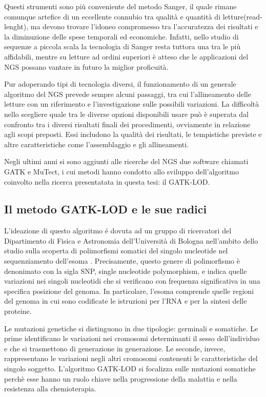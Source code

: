 Questi strumenti sono più conveniente del metodo Sanger, il quale rimane comunque artefice di un eccellente connubio tra qualità e quantità di letture(read-lenght), ma devono trovare l'idoneo compromesso tra l'accuratezza dei risultati e la diminuzione delle spese temporali ed economiche.
Infatti, nello studio di sequenze a piccola scala la tecnologia di Sanger resta tuttora una tra le più affidabili, mentre su letture ad ordini superiori è atteso che le applicazioni del NGS possano vantare in futuro la miglior proficuità.

Pur adoperando tipi di tecnologia diversi, il funzionamento di un generale algoritmo del NGS prevede sempre alcuni passaggi, tra cui l'allineamento delle letture con un riferimento e l'investigazione sulle possibili variazioni.
La difficoltà nello scegliere quale tra le diverse opzioni disponibili usare può è superata dal confronto tra i diversi risultati finali dei procedimenti, ovviamente in relazione agli scopi preposti. 
Essi includono la qualità dei risultati, le tempistiche previste e altre caratteristiche come l'assemblaggio e gli allineamenti.

Negli ultimi anni si sono aggiunti alle ricerche del NGS due software chiamati GATK e MuTect, i cui metodi hanno condotto allo sviluppo dell'algoritmo coinvolto nella ricerca presentatata in questa tesi: il GATK-LOD.


\subsection{Il metodo GATK-LOD e le sue radici}
L'ideazione di questo algoritmo é dovuta ad un gruppo di ricercatori del Dipartimento di Fisica e Astronomia dell'Università di Bologna nell'ambito dello studio sulla scoperta di polimorfismi somatici del singolo nucleotide nel sequenziamento dell'esoma \cite{DoValle2016}.
Precisamente, questo genere di polimorfismo è denonimato con la sigla SNP, single nucleotide polymorphism, e indica quelle variazioni nei singoli nucleotidi che si verificano con frequenza significativa in una specifica posizione del genoma.
In particolare, l'esoma comprende quelle regioni del genoma in cui sono codificate le istruzioni per l'RNA e per la sintesi delle proteine.

Le mutazioni genetiche si distinguono in due tipologie: germinali e somatiche. Le prime identificano le variazioni nei cromosomi determinanti il sesso dell'individuo e che si trasmettono di generazione in generazione. Le seconde, invece, rappresentano le variazioni negli altri cromosomi contenenti le caratteristiche del singolo soggetto. 
L'algoritmo GATK-LOD si focalizza sulle mutazioni somatiche perchè esse hanno un ruolo chiave nella progressione della malattia e nella resistenza alla chemioterapia.

